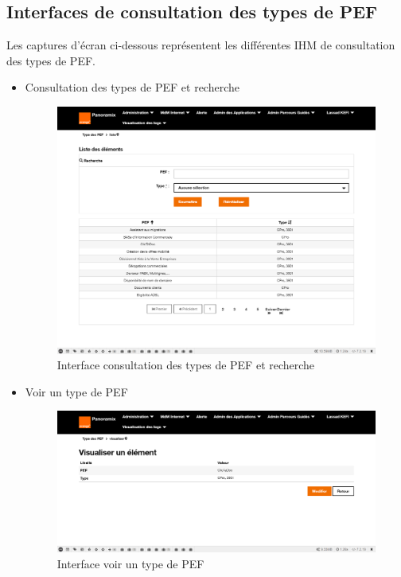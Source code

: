 \subsection{Interfaces de consultation des types de PEF}
Les captures d'écran ci-dessous représentent les différentes IHM de consultation des types de PEF.
\begin{itemize}
	\item Consultation des types de PEF et recherche
	\begin{figure}[H]
		\centering
		\includegraphics[width=0.7\linewidth]{img/screenshots/pef-type/index}
		\caption[Interface consultation des types de PEF et recherche]{Interface consultation des types de PEF et recherche}
		\label{fig:index-tp}
	\end{figure}
	
	\item Voir un type de PEF 
	\begin{figure}[H]
		\centering
		\includegraphics[width=0.7\linewidth]{img/screenshots/pef-type/view}
		\caption[Interface voir un type de PEF ]{Interface voir un type de PEF }
		\label{fig:view-tp}
	\end{figure}
\end{itemize}
\newpage
